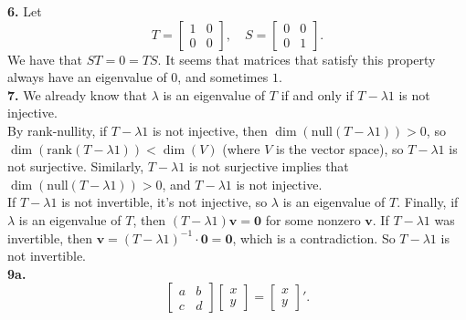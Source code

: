 \documentclass{article}
\newcommand{\bv}{\mathbf{v}}
\newcommand{\bz}{\mathbf{0}}
\begin{document}
\textbf{6.} Let $$T = \begin{bmatrix}
    1 & 0 \\
    0 & 0
\end{bmatrix}, \quad S = \begin{bmatrix}
    0 & 0 \\
    0 & 1
\end{bmatrix}.$$
We have that $ST = 0 = TS$. It seems that matrices that satisfy this property always have an eigenvalue of $0$, and sometimes $1$. \\

\textbf{7.} We already know that $\lambda$ is an eigenvalue of $T$ if and only if $T - \lambda 1$ is not injective. \\

By rank-nullity, if $T - \lambda 1$ is not injective, then $\dim(\text{null}(T - \lambda 1)) > 0$, so $\dim(\text{rank}(T - \lambda 1)) < \dim(V)$ (where $V$ is the vector space), so $T - \lambda 1$ is not surjective. Similarly, $T - \lambda 1$ is not surjective implies that $\dim(\text{null}(T - \lambda 1)) > 0$, and $T - \lambda 1$ is not injective. \\

If $T - \lambda 1$ is not invertible, it's not injective, so $\lambda$ is an eigenvalue of $T$. Finally, if $\lambda$ is an eigenvalue of $T$, then $(T - \lambda 1)\bv = \bz$ for some nonzero $\bv$. If $T - \lambda 1$ was invertible, then $\bv = (T - \lambda 1)^{-1} \cdot \bz = \bz$, which is a contradiction. So $T - \lambda 1$ is not invertible. \\

\textbf{9a.} $$\begin{bmatrix}
    a & b \\
    c & d
\end{bmatrix}
\begin{bmatrix}
    x \\
    y
\end{bmatrix}
= \begin{bmatrix}
    x \\
    y
\end{bmatrix}'.$$
\end{document}
